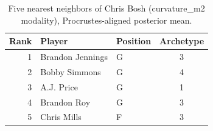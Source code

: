 \begin{table}[htbp]
  \centering\small
  \begin{tabular}{rllc}
    \toprule
    Rank & Player & Position & Archetype \\
    \midrule
    1 & Brandon Jennings & G & 3 \\
    2 & Bobby Simmons & G & 4 \\
    3 & A.J. Price & G & 1 \\
    4 & Brandon Roy & G & 3 \\
    5 & Chris Mills & F & 3 \\
    \bottomrule
  \end{tabular}
  \caption{Five nearest neighbors of Chris Bosh (curvature_m2 modality), Procrustes-aligned posterior mean.}
  \label{tab:Chris_Bosh_neighbors_curvature_m2}
\end{table}

